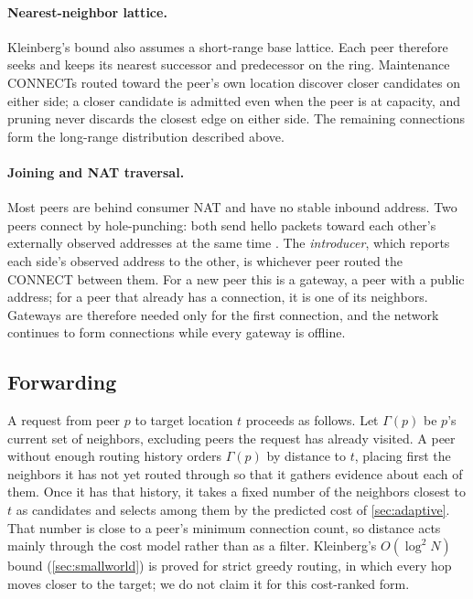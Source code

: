 

\paragraph{Nearest-neighbor lattice.} Kleinberg's bound also assumes a short-range base lattice. Each peer therefore seeks and keeps its nearest successor and predecessor on the ring. Maintenance \textsf{CONNECT}s routed toward the peer's own location discover closer candidates on either side; a closer candidate is admitted even when the peer is at capacity, and pruning never discards the closest edge on either side. The remaining connections form the long-range distribution described above.

\paragraph{Joining and NAT traversal.} Most peers are behind consumer NAT and have no stable inbound address. Two peers connect by hole-punching: both send hello packets toward each other's externally observed addresses at the same time \citep{ford2005peer}. The \emph{introducer}, which reports each side's observed address to the other, is whichever peer routed the \textsf{CONNECT} between them. For a new peer this is a gateway, a peer with a public address; for a peer that already has a connection, it is one of its neighbors. Gateways are therefore needed only for the first connection, and the network continues to form connections while every gateway is offline.

\subsection{Forwarding}

A request from peer $p$ to target location $t$ proceeds as follows. Let $\Gamma(p)$ be $p$'s current set of neighbors, excluding peers the request has already visited. A peer without enough routing history orders $\Gamma(p)$ by distance to $t$, placing first the neighbors it has not yet routed through so that it gathers evidence about each of them. Once it has that history, it takes a fixed number of the neighbors closest to $t$ as candidates and selects among them by the predicted cost of \cref{sec:adaptive}. That number is close to a peer's minimum connection count, so distance acts mainly through the cost model rather than as a filter. Kleinberg's $O(\log^2 N)$ bound (\cref{sec:smallworld}) is proved for strict greedy routing, in which every hop moves closer to the target; we do not claim it for this cost-ranked form.

